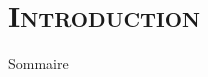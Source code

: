 \section{\scshape Introduction}
\begin{frame}
\titlepage
\end{frame}

\begin{frame}{Sommaire}
	\setlength{\columnsep}{2cm}
	\setlength{\columnseprule}{1pt}
	\begin{multicols}{2}
		\tableofcontents
	\end{multicols}
\end{frame}

